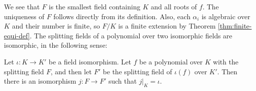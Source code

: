 We see that $F$ is the smallest field containing $K$ and all roots of $f$. The uniqueness of $F$ follows directly from its definition. Also, each $\alpha_i$ is algebraic over $K$ and their number is finite, so $F / K$ is a finite extension by Theorem \ref{thm:finite-equi-def}. 
%
%
The splitting fields of a polynomial over two isomorphic fields are isomorphic, in the following sense:

\begin{theorem} \label{thm:splitting-field-unique}
	Let $\iota: K \to K'$ be a field isomorphism. Let $f$ be a polynomial over $K$ with the splitting field $F$, and then let $F'$ be the splitting field of $\iota(f)$ over $K'$. Then there is an isomorphism $j : F \to F'$ such that $j | _K = \iota$. 
\end{theorem}

